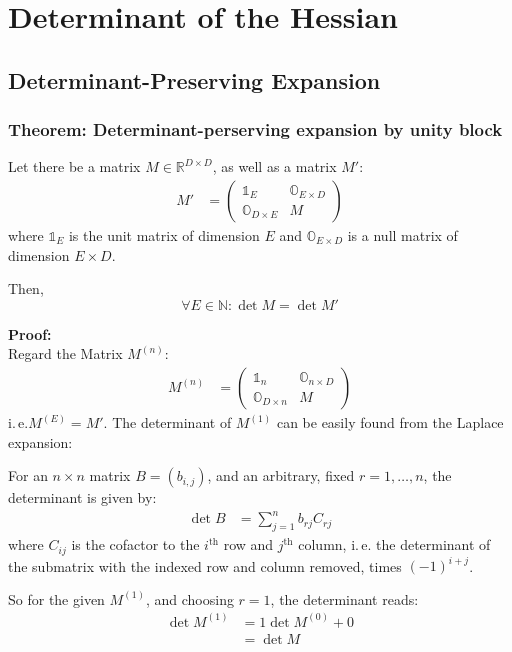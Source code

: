 \documentclass[
	english,
	a4paper,
	fontsize=10pt,
	parskip=half,
	titlepage=true,
	DIV=12,
	final
]{scrreprt}
\newcommand*{\ie}{i.\,e.\xspace}
\newcommand*{\setNaturals} {\ensuremath{\mathbb{N}}}
\newcommand*{\setReals}    {\ensuremath{\mathbb{R}}}
\begin{document}
\section{Determinant of the Hessian}
\subsection{Determinant-Preserving Expansion}
\label{sec:InsertionTheorems}
\subsubsection{Theorem: Determinant-perserving expansion by unity block}
Let there be a matrix $M \in \setReals^{D \times D}$, as well as a matrix $M'$:
\begin{align}
	M'
&=
	\begin{pmatrix}
		\mathds{1}_{E} & \mathds{O}_{E \times D} \\
		\mathds{O}_{D \times E} & M
	\end{pmatrix}
\end{align}
where $\mathds{1}_{E}$ is the unit matrix of dimension $E$ and $\mathds{O}_{E \times D}$ is a null matrix of dimension $E \times D$.

Then,
\begin{equation}
	\forall E \in \setNaturals : \det M = \det M'
\end{equation}

\textbf{Proof:}\\
Regard the Matrix $M^{(n)}$:
\begin{align}
	M^{(n)}
&=
	\begin{pmatrix}
		\mathds{1}_{n} & \mathds{O}_{n \times D} \\
		\mathds{O}_{D \times n} & M
	\end{pmatrix}
\end{align}
\ie $M^{(E)} = M'$. The determinant of $M^{(1)}$ can be easily found from the Laplace expansion:

For an $n \times n$ matrix $B = (b_{i,j})$, and an arbitrary, fixed $r = 1, \ldots, n$, the determinant is given by:
\begin{align}
	\det B
&=
	\sum_{j=1}^{n}
		b_{rj} C_{rj}
\end{align}
where $C_{ij}$ is the cofactor to the $i^{\text{th}}$ row and $j^{\text{th}}$ column, \ie the determinant of the submatrix with the indexed row and column removed, times $(-1)^{i+j}$.

So for the given $M^{(1)}$, and choosing $r = 1$, the determinant reads:
\begin{align}
	\det M^{(1)}
&=
	1 \det M^{(0)} + 0 \\
&=
	\det M
\end{align}
\end{document}
